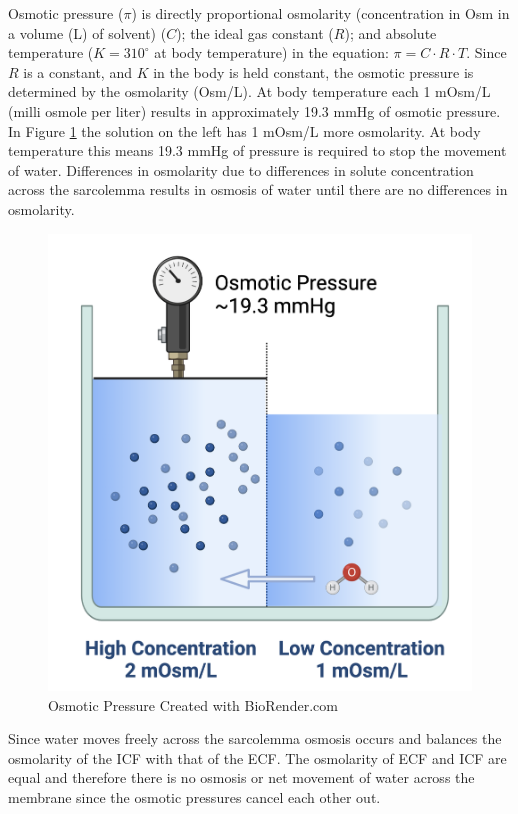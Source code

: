 Osmotic pressure ($\pi$) is directly proportional osmolarity (concentration in Osm in a volume (L) of solvent) ($C$); the ideal gas constant ($R$); and absolute temperature ($K = 310^{\circ}$ at body temperature) in the equation: $\pi = C \cdot R \cdot T$. Since $R$ is a constant, and $K$ in the body is held constant, the osmotic pressure is determined by the osmolarity (Osm/L). At body temperature each 1 mOsm/L (milli osmole per liter) results in approximately 19.3 mmHg of osmotic pressure. In Figure \ref{fig:osmotic_pressure} the solution on the left has 1 mOsm/L more osmolarity. At body temperature this means 19.3 mmHg of pressure is required to stop the movement of water. Differences in osmolarity due to differences in solute concentration across the sarcolemma results in osmosis of water until there are no differences in osmolarity.

\begin{figure}[!h]
    \centering
    \includegraphics[width=1\linewidth]{./figure/osmotic_pressure.png}
    \caption{Osmotic Pressure \footnotesize{Created with BioRender.com}}
    \label{fig:osmotic_pressure}
\end{figure}

Since water moves freely across the sarcolemma osmosis occurs and balances the osmolarity of the ICF with that of the ECF. The osmolarity of ECF and ICF are equal and therefore there is no osmosis or net movement of water across the membrane since the osmotic pressures cancel each other out.

